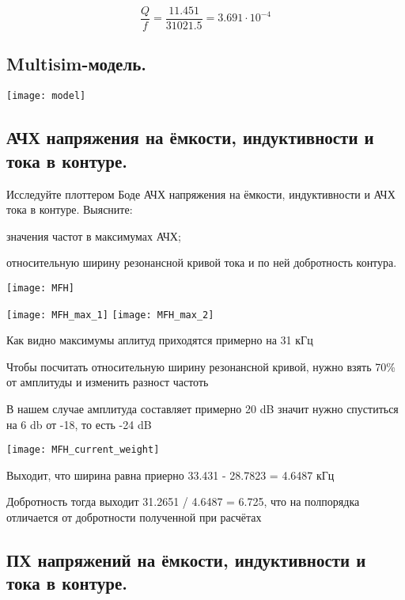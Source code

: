 \documentclass[12pt,a4paper]{article}
\begin{document}
		\[\frac{Q}{f} = \frac{11.451}{31021.5} = 3.691 \cdot 10^{-4}\]
		
		\medskip
		\medskip
		
		
		\subsection{Multisim-модель.\newline}
			\texttt{[image: model]}
			\label{fig:model}

		\newpage
		
		\subsection{АЧХ напряжения на ёмкости, индуктивности и тока в контуре.\newline}	
		
			Исследуйте плоттером Боде АЧХ напряжения на ёмкости, индуктивности и АЧХ тока в контуре.
			Выясните: 
			
			значения частот в максимумах АЧХ;
			
			относительную ширину резонансной кривой тока и по ней добротность контура.
			
						
			\texttt{[image: MFH]}

			\newpage
	
			\texttt{[image: MFH\_max\_1]}
			\texttt{[image: MFH\_max\_2]}
			
			Как видно максимумы аплитуд приходятся примерно на 31 кГц
		
			Чтобы посчитать относительную ширину резонансной кривой, нужно взять 70\% от амплитуды и изменить разност частоть
			
			В нашем случае амплитуда составляет примерно 20 dB значит нужно спуститься на 6 db от -18, то есть -24 dB
			
			\texttt{[image: MFH\_current\_weight]}
			
			Выходит, что ширина равна приерно 33.431 - 28.7823 = 4.6487 кГц
			
			Добротность тогда выходит 31.2651 / 4.6487 = 6.725, что на полпорядка отличается от добротности полученной при расчётах
			
			\newpage			

		\subsection{ПХ напряжений на ёмкости, индуктивности и тока в контуре.\newline}
		
\end{document}
